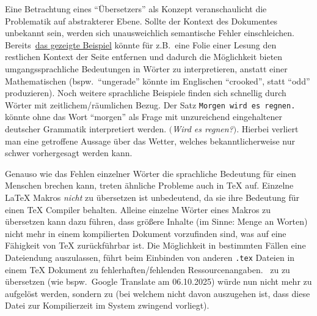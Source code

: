 Eine Betrachtung eines \enquote{Übersetzers} als Konzept veranschaulicht die Problematik auf abstrakterer Ebene. Sollte der Kontext des Dokumentes unbekannt sein, werden sich unausweichlich semantische Fehler einschleichen. Bereits~\hyperref[einleitung:hintergrund]{das gezeigte Beispiel} könnte für z.B.\ eine Folie einer Lesung den restlichen Kontext der Seite entfernen und dadurch die Möglichkeit bieten umgangssprachliche Bedeutungen in Wörter zu interpretieren, anstatt einer Mathematischen (bspw.\ \enquote{ungerade} könnte im Englischen \enquote{crooked}, statt \enquote{odd} produzieren). Noch weitere sprachliche Beispiele finden sich schnellig durch Wörter mit zeitlichem/räumlichen Bezug. Der Satz \texttt{Morgen wird es regnen.} könnte ohne das Wort \enquote{morgen} als Frage mit unzureichend eingehaltener deutscher Grammatik interpretiert werden. $($\textit{Wird es regnen?}$)$. Hierbei verliert man eine getroffene Aussage über das Wetter, welches bekanntlicherweise nur schwer vorhergesagt werden kann.%

\label{einleitung:tex}
Genauso wie das Fehlen einzelner Wörter die sprachliche Bedeutung für einen Menschen brechen kann, treten ähnliche Probleme auch in \TeX{} auf. Einzelne \LaTeX{} Makros \textit{nicht} zu übersetzen ist unbedeutend, da sie ihre Bedeutung für einen \TeX{} Compiler behalten. Alleine einzelne Wörter eines Makros zu übersetzen kann dazu führen, dass größere Inhalte (im Sinne: Menge an Worten) nicht mehr in einem kompilierten Dokument vorzufinden sind, was auf eine Fähigkeit von \TeX{} zurückführbar ist. Die Möglichkeit in bestimmten Fällen eine Dateiendung auszulassen, führt beim Einbinden von anderen \texttt{.tex} Dateien in einem \TeX{} Dokument zu fehlerhaften/fehlenden Ressourcenangaben.\ \verb|| zu \verb|| zu übersetzen (wie bspw.\ Google Translate am 06.10.2025) würde nun nicht mehr zu \verb|| aufgelöst werden, sondern zu \verb|| (bei welchem nicht davon auszugehen ist, dass diese Datei zur Kompilierzeit im System zwingend vorliegt).\\\noindent 

